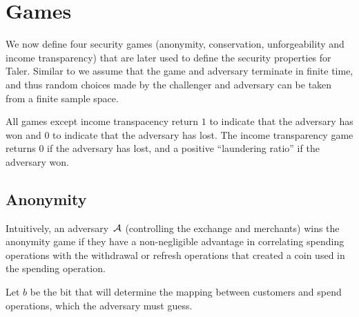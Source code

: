 %
%
%

\section{Games}

We now define four security games (anonymity, conservation, unforgeability and
income transparency) that are later used to define the security properties for
Taler.  Similar to \cite{bellare2006code} we assume that the game and adversary
terminate in finite time, and thus random choices made by the challenger and
adversary can be taken from a finite sample space.

All games except income transpacency return $1$ to indicate that the adversary
has won and $0$ to indicate that the adversary has lost.  The income
transparency game returns $0$ if the adversary has lost, and a positive
``laundering ratio'' if the adversary won.

\subsection{Anonymity}
Intuitively, an adversary~$\mathcal{A}$ (controlling the exchange and merchants) wins the
anonymity game if they have a non-negligible advantage in correlating spending operations
with the withdrawal or refresh operations that created a coin used in the
spending operation.

Let $b$ be the bit that will determine the mapping between customers and spend
operations, which the adversary must guess.

